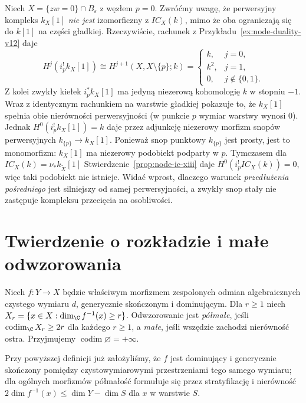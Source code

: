 \begin{przyklad}
\label{prz:node-constant-vs-IC-24}
Niech $X=\{zw=0\}\cap B_\varepsilon$ z węzłem $p=0$.
Zwróćmy uwagę, że perwersyjny kompleks $k_X[1]$
\emph{nie jest} izomorficzny z $IC_X(k)$, mimo że
oba ograniczają się do $k[1]$ na części gładkiej.
Rzeczywiście, rachunek z
Przykładu~\ref{ex:node-duality-v12} daje
\[
 H^j(i_p^!k_X[1])\cong H^{j+1}(X,X\setminus\{p\};k)
 =\begin{cases}
 k,&j=0,\\ k^2,&j=1,\\0,&j\notin\{0,1\}.
 \end{cases}
\]
Z kolei zwykły kiełek $i_p^*k_X[1]$ ma jedyną
niezerową kohomologię $k$ w stopniu $-1$.
Wraz z identycznym rachunkiem na warstwie gładkiej
pokazuje to, że $k_X[1]$ spełnia obie nierówności
perwersyjności (w punkcie $p$ wymiar warstwy wynosi $0$).
Jednak $H^0(i_p^!k_X[1])=k$ daje przez adjunkcję
niezerowy morfizm snopów perwersyjnych
$k_{\{p\}}\to k_X[1]$. Ponieważ snop punktowy
$k_{\{p\}}$ jest prosty, jest to monomorfizm:
$k_X[1]$ ma niezerowy podobiekt podparty w $p$.
Tymczasem dla $IC_X(k)=\nu_*k_{\widetilde X}[1]$
Stwierdzenie~\ref{prop:node-ic-xiii} daje
$H^0(i_p^!IC_X(k))=0$, więc taki podobiekt
nie istnieje. Widać wprost, dlaczego warunek
\emph{przedłużenia pośredniego} jest silniejszy
od samej perwersyjności, a zwykły snop stały
nie zastępuje kompleksu przecięcia na osobliwości.
\end{przyklad}

\section{Twierdzenie o rozkładzie i małe odwzorowania}
\begin{definicja}
Niech $f:Y\to X$ będzie właściwym morfizmem
zespolonych odmian algebraicznych czystego wymiaru $d$,
generycznie skończonym i dominującym. Dla $r\ge1$
niech $X_r=\{x\in X:\dim_\C f^{-1}(x)\ge r\}$.
Odwzorowanie jest \emph{półmałe}, jeśli
$\operatorname{codim}_\C X_r\ge2r$ dla każdego $r\ge1$,
a \emph{małe}, jeśli wszędzie zachodzi
nierówność ostra. Przyjmujemy
$\operatorname{codim}\varnothing=+\infty$.
\end{definicja}
\begin{uwaga}
Przy powyższej definicji już założyliśmy, że $f$ jest
dominujący i generycznie skończony pomiędzy
czystowymiarowymi przestrzeniami tego samego wymiaru;
dla ogólnych morfizmów półmałość formułuje się przez
stratyfikację i nierówność
$2\dim f^{-1}(x)\le\dim Y-\dim S$
dla $x$ w warstwie $S$.
\end{uwaga}

